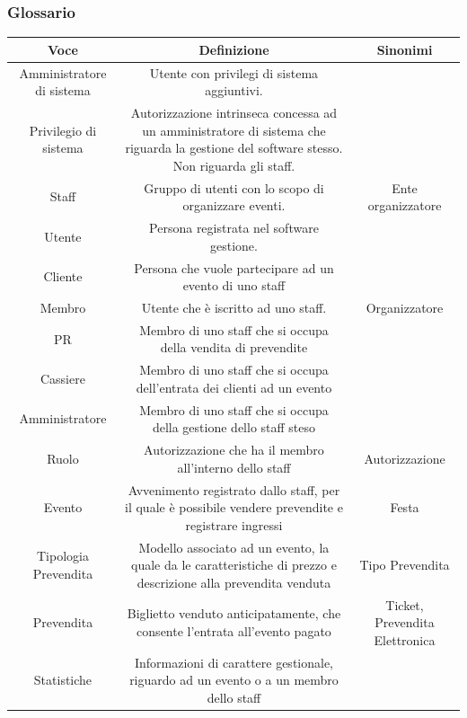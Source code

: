 \documentclass[a4paper]{article}
\begin{document}
\subsubsection{Glossario}

\begin{table}[ht!]
  \begin{center}
    \begin{tabulary}{1\textwidth}{c|C|C}
        \textbf{Voce} & \textbf{Definizione} & \textbf{Sinonimi}\\
        \hline
        \hline
		Amministratore di sistema & Utente con privilegi di sistema aggiuntivi. & \\
		\hline
		Privilegio di sistema & Autorizzazione intrinseca concessa ad un amministratore di sistema che riguarda la gestione del software stesso. Non riguarda gli staff. & \\
		\hline
        Staff & Gruppo di utenti con lo scopo di organizzare eventi. & Ente organizzatore \\
        \hline
        Utente & Persona registrata nel software gestione. & \\
        \hline
		Cliente & Persona che vuole partecipare ad un evento di uno staff & \\
		\hline
        Membro & Utente che è iscritto ad uno staff. & Organizzatore \\
        \hline
		PR & Membro di uno staff che si occupa della vendita di prevendite & \\
		\hline
		Cassiere & Membro di uno staff che si occupa dell'entrata dei clienti ad un evento & \\
		\hline
		Amministratore & Membro di uno staff che si occupa della gestione dello staff steso & \\
		\hline
        Ruolo & Autorizzazione che ha il membro all'interno dello staff & Autorizzazione \\
        \hline
        Evento & Avvenimento registrato dallo staff, per il quale è possibile vendere prevendite e registrare ingressi & Festa \\
        \hline
        Tipologia Prevendita & Modello associato ad un evento, la quale da le caratteristiche di prezzo e descrizione alla prevendita venduta & Tipo Prevendita \\
        \hline
        Prevendita & Biglietto venduto anticipatamente, che consente l'entrata all'evento pagato & Ticket, Prevendita Elettronica \\
        \hline
		Statistiche & Informazioni di carattere gestionale, riguardo ad un evento o a un membro dello staff & \\

\end{tabulary}
\end{center}
\end{table}
\end{document}
